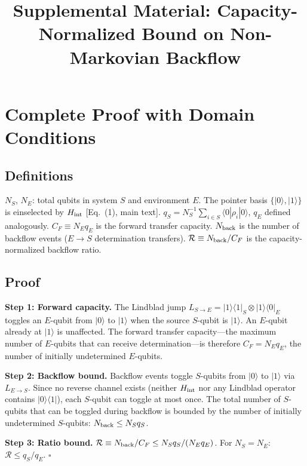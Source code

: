 \documentclass[aps,prl,onecolumn]{revtex4-2}
\begin{document}
\title{Supplemental Material: Capacity-Normalized Bound on Non-Markovian Backflow}

\maketitle

\section{Complete Proof with Domain Conditions}

\subsection{Definitions}

$N_S$, $N_E$: total qubits in system $S$ and environment $E$. The pointer basis $\{|0\rangle,|1\rangle\}$ is einselected by $H_{\rm int}$ [Eq.~(1), main text]. $q_S = N_S^{-1}\sum_{i\in S}\langle 0|\rho_i|0\rangle$, $q_E$ defined analogously. $C_F \equiv N_E q_E$ is the forward transfer capacity. $N_{\rm back}$ is the number of backflow events ($E \to S$ determination transfers). $\mathcal{R} \equiv N_{\rm back}/C_F$ is the capacity-normalized backflow ratio.

\subsection{Proof}

\textbf{Step 1: Forward capacity.} The Lindblad jump $L_{S\to E}=|1\rangle\langle 1|_S\otimes|1\rangle\langle 0|_E$ toggles an $E$-qubit from $|0\rangle$ to $|1\rangle$ when the source $S$-qubit is $|1\rangle$. An $E$-qubit already at $|1\rangle$ is unaffected. The forward transfer capacity---the maximum number of $E$-qubits that can receive determination---is therefore $C_F = N_E q_E$, the number of initially undetermined $E$-qubits.

\textbf{Step 2: Backflow bound.} Backflow events toggle $S$-qubits from $|0\rangle$ to $|1\rangle$ via $L_{E\to S}$. Since no reverse channel exists (neither $H_{\rm int}$ nor any Lindblad operator contains $|0\rangle\langle 1|$), each $S$-qubit can toggle at most once. The total number of $S$-qubits that can be toggled during backflow is bounded by the number of initially undetermined $S$-qubits: $N_{\rm back} \leq N_S q_S$.

\textbf{Step 3: Ratio bound.} $\mathcal{R} \equiv N_{\rm back}/C_F \leq N_S q_S/(N_E q_E)$. For $N_S = N_E$: $\mathcal{R} \leq q_S/q_E$. $\square$
\end{document}
